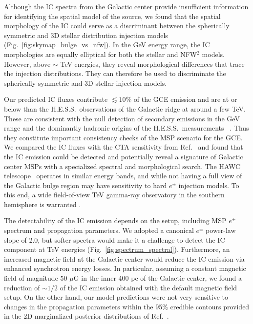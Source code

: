 \documentclass[doublespace,nopageskip]{VTthesis} %
\begin{document}
Although the IC spectra from the Galactic center provide insufficient information for identifying the spatial model of the source, we found that the spatial morphology of the IC could serve as a discriminant between the spherically symmetric and 3D stellar distribution injection models (Fig.~\ref{fig:skymap_bulge_vs_nfw}). In the GeV energy range, the IC morphologies are equally elliptical for both the stellar and NFW$^2$ models. However, above $\sim$ TeV energies, they reveal morphological differences that trace the injection distributions. They can therefore be used to discriminate the spherically symmetric and 3D stellar injection models.

Our predicted IC fluxes contribute $\lesssim 10 \%$ of the GCE emission and are at or below than the H.E.S.S.~observations of the Galactic ridge at around a  few TeV. These are consistent with the null detection of secondary emissions in the GeV range \cite{2016PhRvD..93j3004L} and the dominantly hadronic origins of the H.E.S.S.~measurements ~\cite{2017PhRvL.119c1101G,2016Natur.531..476H}. Thus they constitute important consistency checks of the MSP scenario for the GCE. We compared the IC fluxes with the CTA sensitivity from Ref.~\cite{2015JCAP...03..055S} and found that the IC emission could be detected and potentially reveal a signature of Galactic center MSPs with a specialized spectral and morphological search. The HAWC telescope~\cite{2012NIMPA.692...72D,2013arXiv1310.0074H} operates in similar energy bands, and while not having a full view of the Galactic bulge region may have sensitivity to hard $e^\pm$ injection models. To this end, a wide field-of-view TeV gamma-ray observatory in the southern hemisphere is warranted \cite{2017ICRC...35..851M}.

The detectability of the IC emission depends on the setup, including MSP $e^\pm$ spectrum and propagation parameters. We adopted a canonical $e^\pm$ power-law slope of 2.0, but softer spectra would make it a challenge to detect the IC component at TeV energies (Fig.~\ref{fig:spectrum_spectral}). Furthermore, an increased magnetic field at the Galactic center would reduce the IC emission via enhanced synchrotron energy losses. In particular, assuming a constant magnetic field of magnitude 50 $\mu$G in the inner 400 pc of the Galactic center, we found a reduction of $\sim 1/2$ of the IC emission obtained with the default magnetic field setup. On the other hand, our model predictions were not very sensitive to changes in the propagation parameters within the 95\% credible contours provided in the 2D marginalized posterior distributions of Ref.~\cite{2016ApJ...824...16J}.
\end{document}
